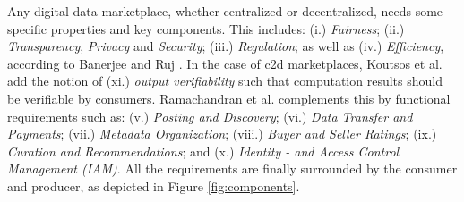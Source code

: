 

Any digital data marketplace, whether centralized or decentralized, needs some specific properties and key components. This includes: (i.) \emph{Fairness}; (ii.) \emph{Transparency}, \emph{Privacy} and \emph{Security}; (iii.) \emph{Regulation}; as well as (iv.) \emph{Efficiency}, according to Banerjee and Ruj \cite{banerjeeBlockchainEnabledData2019}. In the case of \acrshort{c2d} marketplaces, Koutsos et al. \cite{koutsosAgoraPrivacyAwareData} add the notion of (xi.) \emph{output verifiability} such that computation results should be verifiable by consumers. Ramachandran et al. \cite{ramachandranDecentralizedDataMarketplace2018} complements this by functional requirements such as: (v.) \emph{Posting and Discovery}; (vi.) \emph{Data Transfer and Payments}; (vii.) \emph{Metadata Organization}; (viii.) \emph{Buyer and Seller
Ratings}; (ix.) \emph{Curation and Recommendations}; and (x.) \emph{Identity - and Access Control Management (IAM)}. All the requirements are finally surrounded by the consumer and producer, as depicted in Figure \ref{fig:components}.

